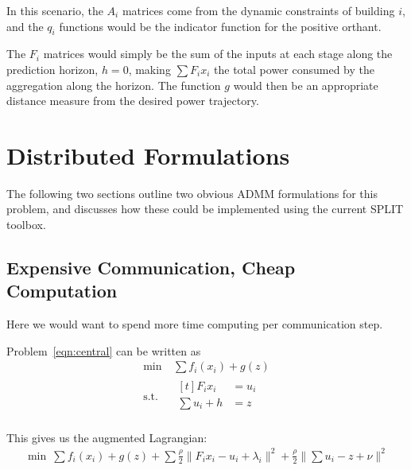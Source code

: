 \documentclass[11pt,a4paper]{article}
\newcommand{\Lag}{\mathcal{L}}
\begin{document}
In this scenario, the $A_i$ matrices come from the dynamic constraints of building $i$, and the $q_i$ functions would be the indicator function for the positive orthant.

The $F_i$ matrices would simply be the sum of the inputs at each stage along the prediction horizon, $h = 0$, making $\sum F_i x_i$ the total power consumed by the aggregation along the horizon. The function $g$ would then be an appropriate distance measure from the desired power trajectory.

\section*{Distributed Formulations}
The following two sections outline two obvious ADMM formulations for this problem, and discusses how these could be implemented using the current SPLIT toolbox.


\subsection*{Expensive Communication, Cheap Computation}
Here we would want to spend more time computing per communication step. 


Problem~\eqref{eqn:central} can be written as
\begin{align*}
  \min\ & \sum f_i(x_i) + g(z)\\
  \text{s.t.}\ & 
  \begin{aligned}[t]
  F_i x_i &= u_i\\
  \sum u_i + h &= z\\
  \end{aligned}
\end{align*}

This gives us the augmented Lagrangian:
\begin{align*}
  \min\ \sum f_i(x_i) + g(z) + \sum \frac{\rho}{2}\|F_ix_i - u_i + \lambda_i\|^2 + \frac{\rho}{2}\|\sum u_i - z + \nu\|^2
\end{align*}
\end{document}
